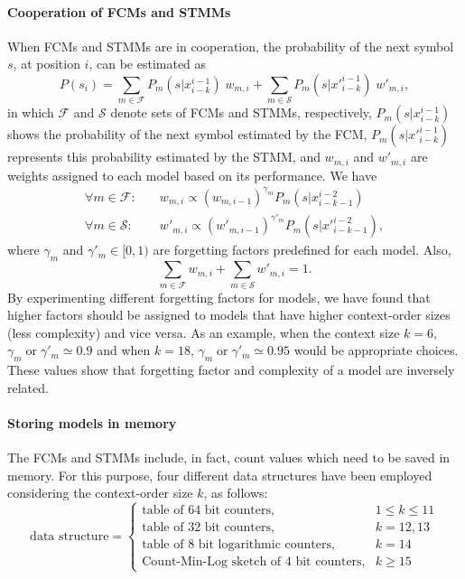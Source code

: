 \paragraph{Cooperation of FCMs and STMMs}
When FCMs and STMMs are in cooperation, the probability of the next symbol $s$, at position $i$, can be estimated as
\begin{equation}
P(s_i) = \sum_{m\in\mathcal{F}} P_m(s|x_{i-k}^{i-1})\;w_{m,i} + \sum_{m\in\mathcal{S}} P_m(s|{x'}_{i-k}^{i-1})\;w'_{m,i},
\end{equation}
in which $\mathcal{F}$ and $\mathcal{S}$ denote sets of FCMs and STMMs, respectively, $P_m(s|x_{i-k}^{i-1})$ shows the probability of the next symbol estimated by the FCM, $P_m(s|{x'}_{i-k}^{i-1})$ represents this probability estimated by the STMM, and $w_{m,i}$ and $w'_{m,i}$ are weights assigned to each model based on its performance. We have
\begin{align}
\forall m\in\mathcal{F}:\quad &w_{m,i} \propto (w_{m,i-1})^{\gamma_m} P_m(s | x_{i-k-1}^{i-2})
\nonumber
\\[1mm]
\forall m\in\mathcal{S}:\quad &w'_{m,i} \propto (w'_{m,i-1})^{\gamma'_m} P_m(s | {x'}_{i-k-1}^{i-2}),
\end{align}
where $\gamma_m$ and $\gamma'_m \in [0,1)$ are forgetting factors predefined for each model. Also,
\begin{equation}
\sum_{m\in\mathcal{F}} w_{m,i} + \sum_{m\in\mathcal{S}} w'_{m,i} = 1.
\end{equation}
By experimenting different forgetting factors for models, we have found that higher factors should be assigned to models that have higher context-order sizes (less complexity) and vice versa. As an example, when the context size $k=6$, $\gamma_m \mathrm{\;or\;} \gamma'_m \simeq 0.9$ and when $k=18$, $\gamma_m \mathrm{\;or\;} \gamma'_m \simeq 0.95$ would be appropriate choices. These values show that forgetting factor and complexity of a model are inversely related.

\paragraph{Storing models in memory}
The FCMs and STMMs include, in fact, count values which need to be saved in memory. For this purpose, four different data structures have been employed considering the context-order size $k$, as follows:
\begin{equation*}
  \textrm{data structure} =
\begin{cases}
  \textrm{table of 64 bit counters}, & 1 \leq k \leq 11 \\
  \textrm{table of 32 bit counters}, & k=12, 13 \\
  \textrm{table of 8 bit logarithmic counters}, & k=14 \\
  \textrm{Count-Min-Log sketch of 4 bit counters}, & k \ge 15
\end{cases}
\end{equation*}


